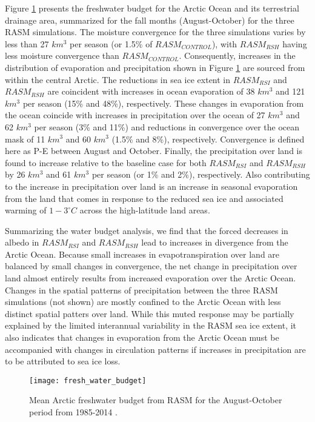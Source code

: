 Figure \ref{fig:fwb} presents the freshwater budget for the Arctic Ocean and its terrestrial drainage area, summarized for the fall months (August-October) for the three RASM simulations.
The  moisture convergence for the three simulations varies by less than 27 $km^3$ per season (or 1.5\% of $RASM_{CONTROL}$), with $RASM_{RSH}$ having less moisture convergence than $RASM_{CONTROL}$.
Consequently, increases in the distribution of evaporation and precipitation shown in Figure \ref{fig:fwb} are sourced from within the central Arctic.
The reductions in sea ice extent in $RASM_{RSI}$ and $RASM_{RSH}$ are coincident with increases in ocean evaporation of 38 $km^3$ and 121 $km^3$ per season (15\% and 48\%), respectively.
These changes in evaporation from the ocean coincide with increases in precipitation over the ocean of 27 $km^3$ and 62 $km^3$ per season (3\% and 11\%) and reductions in convergence over the ocean mask of 11 $km^3$ and 60 $km^3$ (1.5\% and 8\%), respectively.
Convergence is defined here as P-E between August and October.
Finally, the precipitation over land is found to increase relative to the baseline case for both $RASM_{RSI}$ and $RASM_{RSH}$ by 26 $km^3$ and 61 $km^3$ per season (or 1\% and 2\%), respectively.
Also contributing to the increase in precipitation over land is an increase in seasonal evaporation from the land that comes in response to the reduced sea ice and associated warming of $1-3^{\circ}C$ across the high-latitude land areas.

Summarizing the water budget analysis, we find that the forced decreases in albedo in $RASM_{RSI}$ and $RASM_{RSH}$ lead to increases in divergence from the Arctic Ocean.
Because small increases in evapotranspiration over land are balanced by small changes in convergence, the net change in precipitation over land almost entirely results from increased evaporation over the Arctic Ocean.
Changes in the spatial patterns of precipitation between the three RASM simulations (not shown) are mostly confined to the Arctic Ocean with less distinct spatial patters over land.
While this muted response may be partially explained by the limited interannual variability in the RASM sea ice extent, it also indicates that changes in evaporation from the Arctic Ocean must be accompanied with changes in circulation patterns if increases in precipitation are to be attributed to sea ice loss.

\begin{figure}
  \centering
  \texttt{[image: fresh\_water\_budget]}
  \caption{Mean Arctic freshwater budget from RASM for the August-October period from 1985-2014 \citep[adapted from][]{Serreze_2006a}.}
  \label{fig:fwb}
\end{figure}

